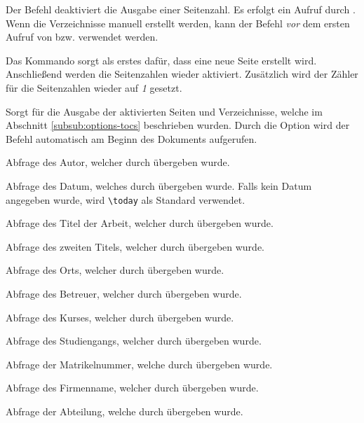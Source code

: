 \documentclass[babel=ngerman,highlight=false]{skdoc}
\begin{document}
            \DescribeMacro\dhbwfrontmatter{} Der Befehl deaktiviert die Ausgabe einer Seitenzahl. Es erfolgt ein Aufruf durch . Wenn die Verzeichnisse manuell erstellt werden, kann der Befehl \textit{vor} dem ersten Aufruf von  bzw.  verwendet werden.
            
            \DescribeMacro\dhbwmainmatter{} Das Kommando sorgt als erstes dafür, dass eine neue Seite erstellt wird. Anschließend werden die Seitenzahlen wieder aktiviert. Zusätzlich wird der Zähler für die Seitenzahlen wieder auf \textit{1} gesetzt.
            
            \DescribeMacro\dhbwprintintro{} Sorgt für die Ausgabe der aktivierten Seiten und Verzeichnisse, welche im Abschnitt \ref{subsub:options-tocs} beschrieben wurden. Durch die Option  wird der Befehl automatisch am Beginn des Dokuments aufgerufen.

            \DescribeMacro\getAuthor Abfrage des Autor, welcher durch  übergeben wurde.

            \DescribeMacro\getDate Abfrage des Datum, welches durch  übergeben wurde. Falls kein Datum angegeben wurde, wird \verb|\today| als Standard verwendet.

            \DescribeMacro\getThesisTitle Abfrage des Titel der Arbeit, welcher durch  übergeben wurde.

            \DescribeMacro\getThesisSecondTitle Abfrage des zweiten Titels, welcher durch  übergeben wurde.

            \DescribeMacro\getLocation Abfrage des Orts, welcher durch  übergeben wurde.

            \DescribeMacro\getSupervisor Abfrage des Betreuer, welcher durch  übergeben wurde.

            \DescribeMacro\getCourseId Abfrage des Kurses, welcher durch  übergeben wurde.

            \DescribeMacro\getCourseName Abfrage des Studiengangs, welcher durch  übergeben wurde.

            \DescribeMacro\getStudentId Abfrage der Matrikelnummer, welche durch  übergeben wurde.

            \DescribeMacro\getInstitute Abfrage des Firmenname, welcher durch  übergeben wurde.

            \DescribeMacro\getInstituteSection Abfrage der Abteilung, welche durch  übergeben wurde.
\end{document}
